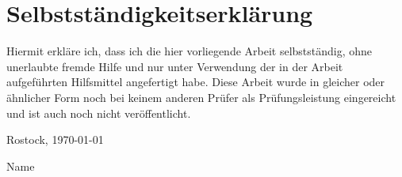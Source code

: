 \section*{Selbstst{\"a}ndigkeitserkl{\"a}rung}



Hiermit erkl{\"a}re ich, dass ich die hier vorliegende Arbeit selbstst{\"a}ndig, ohne unerlaubte
fremde Hilfe und nur unter Verwendung der in der Arbeit aufgef{\"u}hrten Hilfsmittel
angefertigt habe. Diese Arbeit wurde in gleicher oder ähnlicher Form noch bei keinem anderen
Prüfer als Prüfungsleistung eingereicht und ist auch noch nicht veröffentlicht.


\vspace{2cm}

Rostock, \today{}

\vspace{1cm}

\parbox{8cm}{\hrulefill}

Name